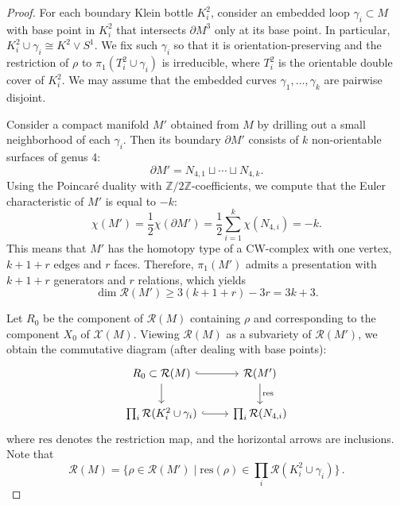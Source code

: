 \documentclass[12pt,reqno]{amsart}
\theoremstyle{definition}
\def\calR{\mathcal R}
\def\calX{\mathcal X}
\begin{document}
\begin{proof}
    For each boundary Klein bottle $K_i^2$, consider an embedded 
    loop $\gamma_i\subset M$
    with base point in $K^2_i$ that intersects $\partial M^3$ only at its base point. 
    In particular,
    $K_i^2\cup \gamma_i\cong K^2\vee S^1$. 
    We fix such $\gamma_i$ so that it is orientation-preserving and
    the restriction of $\rho$ to   
    $\pi_1(T^2_i \cup \gamma_i) $ is irreducible, where $T^2_i$ 
    is the orientable double cover of $K^2_i$. 
    We may assume that the embedded curves $\gamma_1,\dotsc,\gamma_k$ are pairwise disjoint. 
    
    Consider a compact manifold $M'$ obtained from $M$ by drilling out a small neighborhood of each $\gamma_i$. Then its boundary $\partial M'$
    consists of $k$ non-orientable surfaces of genus 4:
    $$
        \partial M'=N_{4,1}\sqcup\dotsb\sqcup N_{4,k}.
    $$ 
    Using the Poincaré duality with $\mathbb{Z}/2\mathbb{Z}$-coefficients, we compute that the Euler 
    characteristic of $M'$ is equal to $-k$:
    $$
    \chi(M')=\frac{1}{2}\chi(\partial M')=\frac{1}{2}\sum_{i=1}^k\chi(N_{4,i})=-k.
    $$
    This means that $M'$ has the homotopy type of a 
    CW-complex with one vertex, $k+1+r$ edges 
    and $r$ faces. Therefore, $\pi_1(M')$ admits a presentation with $k+1+r$ generators and 
    $r$ relations, which yields
    \begin{equation}
        \label{eqn:dimM'}
        \dim \calR(M')\geq 3(k+1+r)-3 r= 3k+3.
    \end{equation}

    Let $R_0$ be the component of $\calR(M)$ containing $\rho$ and corresponding to the component $X_0$ of $\calX(M)$.
    Viewing $\calR(M)$ as a subvariety of $\calR(M')$, we obtain the commutative diagram
    (after dealing with base points):
    \begin{equation}
        \label{eqn:CDR(M)}
        \begin{tikzcd}
            R_0 \subset \calR(M) \arrow[r, hookrightarrow] \arrow[d] &
            \calR(M') \arrow[d, "\mathrm{res}"] \\
            \prod_i \calR(K^2_i\cup \gamma_i) \arrow[r, hookrightarrow] & \prod_i \calR( N_{4,i})
        \end{tikzcd}
    \end{equation}
    where $\mathrm{res}$ denotes the restriction map, and the horizontal arrows are inclusions. 
    Note that
    $$
       \calR(M)=\{\rho\in \calR(M')\mid \mathrm{res}(\rho)\in \prod_i \calR(K^2_i\cup \gamma_i) \} \,.
    $$


\end{proof}
\end{document}
